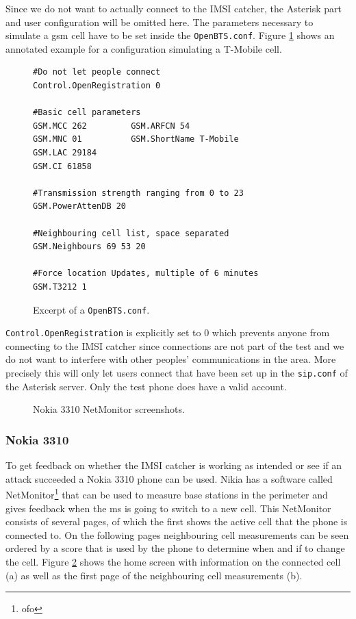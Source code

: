 Since we do not want to actually connect to the IMSI catcher, the Asterisk part and user configuration will be omitted here.
The parameters necessary to simulate a \gls{gsm} cell have to be set inside the \texttt{OpenBTS.conf}.
Figure \ref{fig:openbts_parameters} shows an annotated example for a configuration simulating a T-Mobile cell.
\begin{figure}
\hspace*{\dimexpr\fboxsep+\fboxrule}%
\begin{minipage}{\dimexpr\textwidth-4\fboxsep-2\fboxrule} 
\begin{lstlisting}
#Do not let people connect
Control.OpenRegistration 0

#Basic cell parameters
GSM.MCC 262			GSM.ARFCN 54
GSM.MNC 01			GSM.ShortName T-Mobile
GSM.LAC 29184		
GSM.CI 61858
	
#Transmission strength ranging from 0 to 23
GSM.PowerAttenDB 20

#Neighbouring cell list, space separated
GSM.Neighbours 69 53 20

#Force location Updates, multiple of 6 minutes
GSM.T3212 1
\end{lstlisting}
\end{minipage}
\caption{Excerpt of a \texttt{OpenBTS.conf}.}
\label{fig:openbts_parameters}
\end{figure}
\texttt{Control.OpenRegistration} is explicitly set to 0 which prevents anyone from connecting to the IMSI catcher since connections are not part of the test and we do not want to interfere with other peoples' communications in the area.
More precisely this will only let users connect that have been set up in the \texttt{sip.conf} of the Asterisk server.
Only the test phone does have a valid account.

\begin{figure}
\centering
{}
\caption{Nokia 3310 NetMonitor screenshots.}
\label{fig:netmonitor}
\end{figure}

\subsubsection{Nokia 3310}
To get feedback on whether the IMSI catcher is working as intended or see if an attack succeeded a Nokia 3310 phone can be used.
Nikia has a software called NetMonitor\footnote{ofo} that can be used to measure base stations in the perimeter and gives feedback when the \gls{ms} is going to switch to a new cell.
This NetMonitor consists of several pages, of which the first shows the active cell that the phone is connected to.
On the following pages neighbouring cell measurements can be seen ordered by a score that is used by the phone to determine when and if to change the cell.
Figure \ref{fig:netmonitor} shows the home screen with information on the connected cell (a) as well as the first page of the neighbouring cell measurements (b).

